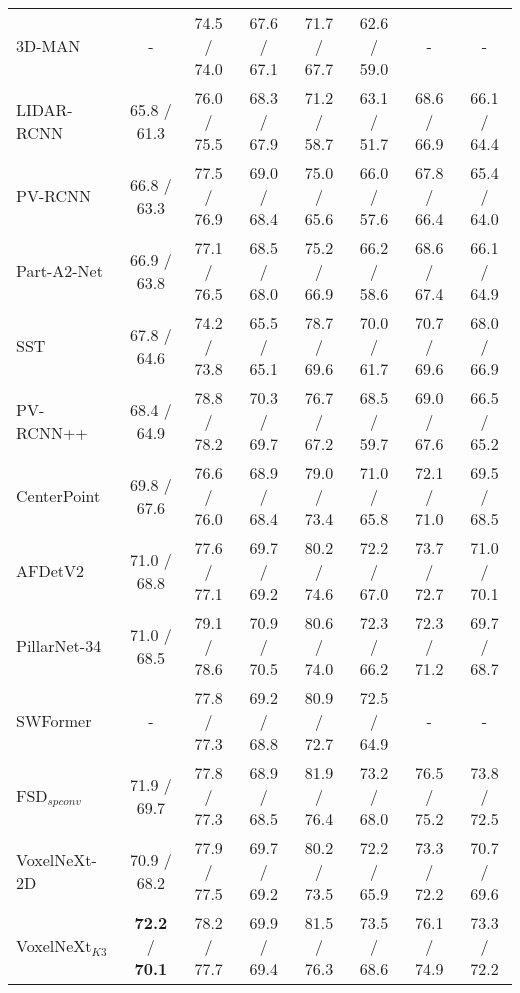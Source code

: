 \documentclass[10pt,twocolumn,letterpaper]{article}
\begin{document}
\begin{table*}[t]
\begin{center}
{\begin{tabular}{|l|c|cc|cc|cc|}
3D-MAN~\cite{3d-man}                                        &  -  & 74.5 / 74.0 & 67.6 / 67.1 & 71.7 / 67.7 & 62.6 / 59.0   &  -  &  -     \\
LIDAR-RCNN~\cite{lidar-rcnn}                                     & 65.8 / 61.3 & 76.0 / 75.5     & 68.3 / 67.9    & 71.2 / 58.7      & 63.1 / 51.7      & 68.6 / 66.9     & 66.1 / 64.4    \\
PV-RCNN~\cite{pvrcnn}                                        & 66.8 / 63.3 & 77.5 / 76.9     & 69.0 / 68.4    & 75.0 / 65.6      & 66.0 / 57.6      & 67.8 / 66.4     & 65.4 / 64.0    \\
Part-A2-Net~\cite{part-a2}                                    & 66.9 / 63.8 & 77.1 / 76.5     & 68.5 / 68.0    & 75.2 / 66.9      & 66.2 / 58.6      & 68.6 / 67.4     & 66.1 / 64.9    \\
SST~\cite{single-stride-transformer}                                            & 67.8 / 64.6 & 74.2 / 73.8     & 65.5 / 65.1    & 78.7 / 69.6      & 70.0 / 61.7      & 70.7 / 69.6     & 68.0 / 66.9    \\
PV-RCNN++~\cite{pvrcnn++}                                      & 68.4 / 64.9 & 78.8 / 78.2     & 70.3 / 69.7    & 76.7 / 67.2      & 68.5 / 59.7      & 69.0 / 67.6     & 66.5 / 65.2    \\
CenterPoint~\cite{centerpoint}                                    & 69.8 / 67.6 & 76.6 / 76.0     & 68.9 / 68.4    & 79.0 / 73.4      & 71.0 / 65.8      & 72.1 / 71.0     & 69.5 / 68.5    \\
AFDetV2~\cite{afdetv2}                                        & 71.0 / 68.8 & 77.6 / 77.1     & 69.7 / 69.2    & 80.2 / 74.6      & 72.2 / 67.0      & 73.7 / 72.7     & 71.0 / 70.1    \\
PillarNet-34~\cite{pillarnet}                                   & 71.0 / 68.5 & {79.1} / {78.6}     & {70.9} / {70.5}    & 80.6 / 74.0      & 72.3 / 66.2      & 72.3 / 71.2     & 69.7 / 68.7    \\
SWFormer~\cite{swformer}                                       & -         & 77.8 / 77.3     & 69.2 / 68.8    & 80.9 / 72.7      & 72.5 / 64.9      & -             & -            \\ 
FSD$_{spconv}$~\cite{fsd}                                      & 71.9 / 69.7 & 77.8 / 77.3     & 68.9 / 68.5    & 81.9 / 76.4      & 73.2 / 68.0      & 76.5 / 75.2     & 73.8 / 72.5    \\
\hline
VoxelNeXt-2D            &    70.9 / 68.2       & 77.9 / 77.5     & 69.7 / 69.2    & 80.2 / 73.5      & 72.2 / 65.9      & 73.3 / 72.2     & 70.7 / 69.6    \\
VoxelNeXt$_{K3}$    &    \textbf{72.2} / \textbf{70.1}       & 78.2 / 77.7     & 69.9 / 69.4    & 81.5 / 76.3      & 73.5 / 68.6      & 76.1 / 74.9     & 73.3 / 72.2    \\
\hline
\end{tabular}
}
\label{tab:waymo-val}
\end{center}
\end{table*}
\end{document}
